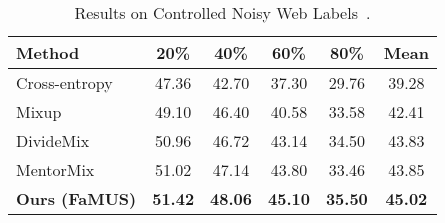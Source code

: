\documentclass[final]{cvpr}
\begin{document}
\begin{table}[t]
	\centering
	\small
	\begin{tabular}{|l|cccc|c|}
		\hline
		Method & 20\% & 40\% & 60\% & 80\% & Mean\\
		\hline
		Cross-entropy & 47.36 & 42.70 & 37.30 & 29.76 & 39.28 \\
		\hline
		Mixup~\cite{zhang2017mixup} & 49.10 & 46.40 & 40.58 & 33.58 & 42.41 \\
		\hline
		DivideMix~\cite{li2020dividemix} & 50.96 & 46.72 & 43.14 & 34.50 & 43.83 \\ 
		\hline
		MentorMix~\cite{jiang2020beyond} & 51.02 & 47.14 & 43.80 & 33.46 & 43.85 \\
		\hline\hline
		\textbf{Ours (FaMUS)} & \textbf{51.42} & \textbf{48.06} & \textbf{45.10} & \textbf{35.50} & \textbf{45.02} \\
		\hline
	\end{tabular}
	\vspace{-1mm}
	\caption{Results on Controlled Noisy Web Labels~\cite{jiang2020beyond}. 
	}\label{tab:cnwl}
	\vspace{-6mm}
\end{table}
 
\end{document}
